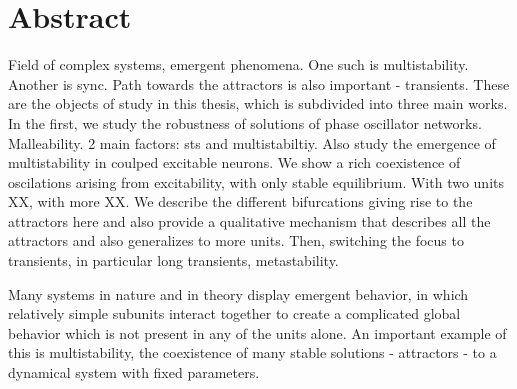 \section*{Abstract}

Field of complex systems, emergent phenomena. One such is multistability. Another is sync. Path towards the attractors is also important - transients. These are the objects of study in this thesis, which is subdivided into three main works. In the first, we study the robustness of solutions of phase oscillator networks. Malleability. 2 main factors: sts and multistabiltiy. Also study the emergence of multistability in coulped excitable neurons. We show a rich coexistence of oscilations arising from excitability, with only stable equilibrium. With two units XX, with more XX. We describe the different bifurcations giving rise to the attractors here and also provide a qualitative mechanism that describes all the attractors and also generalizes to more units. Then, switching the focus to transients, in particular long transients, metastability.

Many systems in nature and in theory display emergent behavior, in which relatively simple subunits interact together to create a complicated global behavior which is not present in any of the units alone. An important example of this is multistability, the coexistence of many stable solutions - attractors - to a dynamical system with fixed parameters. 



